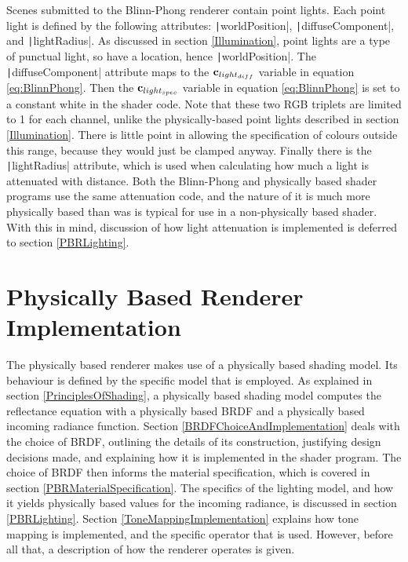 Scenes submitted to the Blinn-Phong renderer contain point lights. Each point light is defined by the following attributes: \texttt|worldPosition|, \texttt|diffuseComponent|, and \texttt|lightRadius|. As discussed in section \ref{Illumination}, point lights are a type of punctual light, so have a location, hence \texttt|worldPosition|. The \texttt|diffuseComponent| attribute maps to the \begin{math}\mathbf{c}_{light_{diff}}\end{math} variable in equation \ref{eq:BlinnPhong}. Then the \begin{math}\mathbf{c}_{light_{spec}}\end{math} variable in equation \ref{eq:BlinnPhong} is set to a constant white in the shader code. Note that these two RGB triplets are limited to 1 for each channel, unlike the physically-based point lights described in section \ref{Illumination}. There is little point in allowing the specification of colours outside this range, because they would just be clamped anyway. Finally there is the \texttt|lightRadius| attribute, which is used when calculating how much a light is attenuated with distance. Both the Blinn-Phong and physically based shader programs use the same attenuation code, and the nature of it is much more physically based than was is typical for use in a non-physically based shader. With this in mind, discussion of how light attenuation is implemented is deferred to section \ref{PBRLighting}.

\section{Physically Based Renderer Implementation} \label{PBRImplementation}

The physically based renderer makes use of a physically based shading model. Its behaviour is defined by the specific model that is employed. As explained in section \ref{PrinciplesOfShading}, a physically based shading model computes the reflectance equation with a physically based BRDF and a physically based incoming radiance function. Section \ref{BRDFChoiceAndImplementation} deals with the choice of BRDF, outlining the details of its construction, justifying design decisions made, and explaining how it is implemented in the shader program. The choice of BRDF then informs the material specification, which is covered in section \ref{PBRMaterialSpecification}. The specifics of the lighting model, and how it yields physically based values for the incoming radiance, is discussed in section \ref{PBRLighting}. Section \ref{ToneMappingImplementation} explains how tone mapping is implemented, and the specific operator that is used. However, before all that, a description of how the renderer operates is given.

